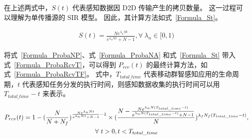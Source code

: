在上述两式中，$S(t)$ 代表感知数据因 D2D 传输产生的拷贝数量。
这一过程可以理解为单传播源的 SIR 模型。
因此，其计算方法如式~\eqref{Formula_St}。

\begin{equation}
\label{Formula_St}
\begin{aligned}
    S(t) = \frac{N e^{\lambda_n N t}}{e^{\lambda_n N t} + N -1}, \forall \ \lambda_n \in [0,1)
  \end{aligned}
\end{equation}

将式~\eqref{Formula_ProbaNP}、式~\eqref{Formula_ProbaNA} 和式~\eqref{Formula_St} 带入式~\eqref{Formula_ProbaRcvT}，可以得到 $P_{rcv}(t)$ 的最终计算方法，如式~\eqref{Formula_ProbaRcvTF}。
式中，$T_{total\_time}$ 代表移动群智感知应用的生命周期，$t$ 代表感知任务分发的执行时间，则感知数据收集的执行时间可以用 $T_{total\_time} - t$ 来表示。

\begin{equation}
\vspace{-2em}
\label{Formula_ProbaRcvTF}
  \begin{gathered}
    P_{rcv}(t) = 1 -  (\frac{N}{N + N_f})^{\frac{N e^{\lambda_n N t}}{e^{\lambda_n N t} + N -1} - 1} \times (\frac{N-\frac{N e^{\lambda_n N (T_{total\_time} - t)}}{e^{\lambda_n N (T_{total\_time} - t)} + N -1}}{N})^{\lambda_f N_f (T_{total\_time} - t)}, \\
    \forall \  t > 0, t < T_{total\_time}
  \end{gathered}
\end{equation}




